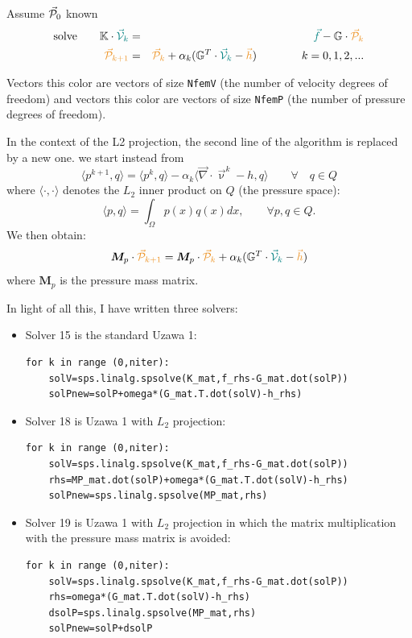 Assume $\vec{\cal P}_0$ known
\begin{eqnarray}
\text{solve} \qquad \mathbb{K} \cdot {\color{teal} \vec{\cal V}_k} 
&=& {\color{teal} \vec{f}} - \mathbb{G}\cdot {\color{carrotorange} \vec{\cal P}_{k}}  \nn\\
{\color{carrotorange} \vec{\cal P}_{k+1}} &=& 
{\color{carrotorange} \vec{\cal P}_{k}}  
+ \alpha_k (\mathbb{G}^T\cdot {\color{teal} \vec{\cal V}_k}   - {\color{carrotorange}\vec{h}})
\quad
\quad
\quad
\quad
k=0,1,2, ... 
\end{eqnarray}

Vectors this {\color{teal} color} are vectors of size \lstinline{NfemV} (the number 
of velocity degrees of freedom) and vectors this {\color{carrotorange} color} are 
vectors of size \lstinline{NfemP} (the number of pressure degrees of freedom).

In the context of the L2 projection, the second line of the algorithm 
is replaced by a new one.
we start instead from 
\[
\langle p^{k+1},q  \rangle = 
\langle p^{k},q  \rangle -\alpha_k \langle \vec\nabla \cdot \vec{\upnu}^{k} -h ,q \rangle 
\qquad \forall \quad q\in Q 
\]
where $\langle \cdot,\cdot  \rangle$ denotes the $L_2$ inner product on $Q$ (the pressure space):
\[
\langle p,q \rangle = \int_\Omega p(x)q(x) dx, \qquad \forall p,q \in Q.
\]
We then obtain:
\[
{\bm M}_p \cdot {\color{carrotorange} \vec{\cal P}_{k+1}} 
=
{\bm M}_p \cdot {\color{carrotorange} \vec{\cal P}_{k}}  
+\alpha_k  (\mathbb{G}^T\cdot {\color{teal} \vec{\cal V}_k}   - {\color{carrotorange}\vec{h}})
\]
where ${\bm M}_p$ is the pressure mass matrix.

In light of all this, I have written three solvers:
\begin{itemize}
\item Solver 15 is the standard Uzawa 1:
\begin{lstlisting}
for k in range (0,niter):
    solV=sps.linalg.spsolve(K_mat,f_rhs-G_mat.dot(solP))
    solPnew=solP+omega*(G_mat.T.dot(solV)-h_rhs)         
\end{lstlisting}

\item Solver 18 is Uzawa 1 with $L_2$ projection:
\begin{lstlisting}
for k in range (0,niter):
    solV=sps.linalg.spsolve(K_mat,f_rhs-G_mat.dot(solP))     
    rhs=MP_mat.dot(solP)+omega*(G_mat.T.dot(solV)-h_rhs)      
    solPnew=sps.linalg.spsolve(MP_mat,rhs)   
\end{lstlisting}


\item Solver 19 is Uzawa 1 with $L_2$ projection in which 
the matrix multiplication with the pressure mass matrix is avoided:
\begin{lstlisting}
for k in range (0,niter):
    solV=sps.linalg.spsolve(K_mat,f_rhs-G_mat.dot(solP))   
    rhs=omega*(G_mat.T.dot(solV)-h_rhs)                     
    dsolP=sps.linalg.spsolve(MP_mat,rhs)   
    solPnew=solP+dsolP                                    
\end{lstlisting}

\end{itemize}

